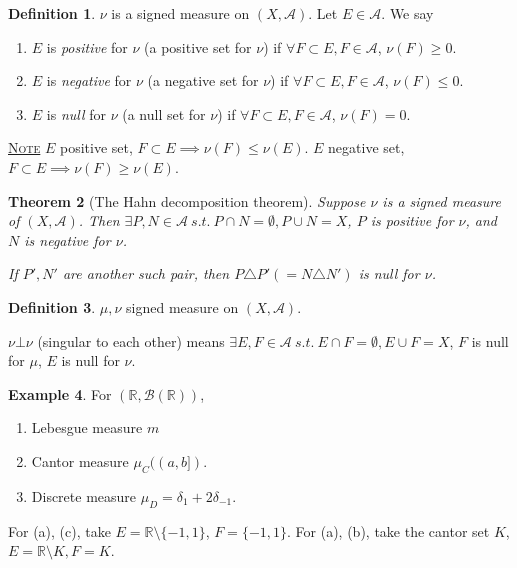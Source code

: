\documentclass{report}
\newcommand{\R}{\mathbb{R}}
\newcommand{\st}{\ s.t.\ }
\newcommand{\cA}{\mathcal{A}}
\newcommand{\cB}{\mathcal{B}}
\newcommand{\fancyem}[1]{\underline{\textsc{#1}}}
\newtheorem{theorem}{Theorem}[chapter]
\theoremstyle{definition}
\newtheorem{definition}[theorem]{Definition}
\newtheorem{example}[theorem]{Example}
\theoremstyle{remark}
\begin{document}
\begin{definition}
	$\nu$ is a signed measure on $(X, \cA)$. Let $E \in \cA$. We say \begin{enumerate}
		\item $E$ is \emph{positive} for $\nu$ (a positive set for $\nu$) if $\forall F \subset E, F \in \cA$, $\nu(F) \geq 0$.
		\item $E$ is \emph{negative} for $\nu$ (a negative set for $\nu$) if $\forall F \subset E, F \in \cA$, $\nu(F) \leq 0$.
		\item $E$ is \emph{null} for $\nu$ (a null set for $\nu$) if $\forall F \subset E, F \in \cA$, $\nu(F) = 0$.
	\end{enumerate}
\end{definition}

\fancyem{Note} $E$ positive set, $F \subset E \implies \nu(F) \leq \nu(E)$. $E$ negative set, $F \subset E \implies \nu(F) \geq \nu(E)$.

\begin{theorem}[The Hahn decomposition theorem]
	Suppose $\nu$ is a signed measure of $(X, \cA)$. Then $\exists P, N \in \cA \st P \cap N = \emptyset, P \cup N = X$, $P$ is positive for $\nu$, and $N$ is negative for $\nu$.

	If $P', N'$ are another such pair, then $P \triangle P' (= N \triangle N')$ is null for $\nu$.
\end{theorem}

\begin{definition}
	$\mu, \nu$ signed measure on $(X, \cA)$.

	$\nu \bot \nu$ (singular to each other) means $\exists E, F \in \cA \st E \cap F = \emptyset, E \cup F = X$, $F$ is null for $\mu$, $E$ is null for $\nu$.
\end{definition}
\begin{example}
	For $(\R, \cB(\R))$, \begin{enumerate}
		\item Lebesgue measure $m$
		\item Cantor measure $\mu_C((a, b])$.
		\item Discrete measure $\mu_D = \delta_1 + 2 \delta_{-1}$.
	\end{enumerate}
	For (a), (c), take $E = \R \setminus \{-1, 1\}$, $F = \{-1, 1\}$. For (a), (b), take the cantor set $K$, $E = \R \setminus K, F = K$.
\end{example}

{}

\end{document}
